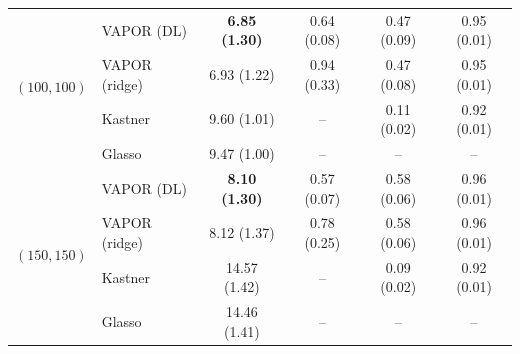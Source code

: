 \begin{table}[t]
\begin{tabular}{llcccc}
\midrule
\multirow{4}{*}{$(100,100)$}
  & VAPOR (DL)    & \textbf{6.85 (1.30)} & 0.64 (0.08) & 0.47 (0.09) & 0.95 (0.01)\\
  & VAPOR (ridge) & 6.93 (1.22) & 0.94 (0.33) & 0.47 (0.08) & 0.95 (0.01)\\
  & Kastner       & 9.60 (1.01) & --          & 0.11 (0.02) & 0.92 (0.01)\\
  & Glasso        & 9.47 (1.00) & --          & --          & --\\
\midrule
\multirow{4}{*}{$(150,150)$}
  & VAPOR (DL)    & \textbf{8.10 (1.30)} & 0.57 (0.07) & 0.58 (0.06) & 0.96 (0.01)\\
  & VAPOR (ridge) & 8.12 (1.37) & 0.78 (0.25) & 0.58 (0.06) & 0.96 (0.01)\\
  & Kastner       & 14.57 (1.42)& --          & 0.09 (0.02) & 0.92 (0.01)\\
  & Glasso        & 14.46 (1.41)& --          & --          & --\\
\bottomrule
\end{tabular}
\end{table}

